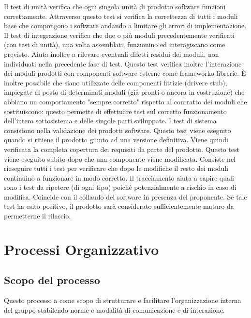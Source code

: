 \documentclass[a4paper,11pt]{article}
\begin{document}
				Il test di unità verifica che ogni singola unità di prodotto software funzioni correttamente.
Attraverso questo test si verifica la correttezza di tutti i moduli base che compongono i software andando
a limitare gli errori di implementazione.
				Il test di integrazione verifica che due o più moduli precedentemente verificati (con test di unità), una volta assemblati, funzionino ed interagiscano come previsto. Aiuta inoltre a rilevare eventuali difetti residui dei moduli, non individuati nella precedente fase di test. Questo test verifica inoltre l'interazione dei moduli prodotti con componenti software esterne come framework\addglos o librerie. È inoltre possibile che siano utilizzate delle componenti fittizie (driver\addglos e stub\addglos), impiegate al posto di determinati moduli (già pronti o ancora in costruzione) che abbiano un comportamento "sempre corretto" rispetto al contratto dei moduli che sostituiscono: questo permette di effettuare test sul corretto funzionamento dell'intero sottosistema e delle singole parti sviluppate.
				I test di sistema consistono nella validazione dei prodotti software. Questo test viene eseguito quando si ritiene il prodotto giunto ad una versione definitiva. Viene quindi verificata la completa copertura dei requisiti da parte del prodotto.
				Questo test viene eseguito subito dopo che una componente viene modificata. Consiste nel rieseguire tutti i test per verificare che dopo le modifiche il resto dei moduli continuino a funzionare in modo corretto. Il tracciamento aiuta a capire quali sono i test da ripetere (di ogni tipo) poiché potenzialmente a rischio in caso di modifica.
				Coincide con il collaudo del software in presenza del proponente. Se tale test ha esito positivo, il prodotto sarà considerato sufficientemente maturo da permetterne il rilascio.
		\pagebreak
	\section{Processi Organizzativo}
		\subsection{Scopo del processo}
		Questo processo a come scopo di strutturare e facilitare l'organizzazione interna del gruppo stabilendo norme e modalità di comunicazione e di interazione.
		
\end{document}
